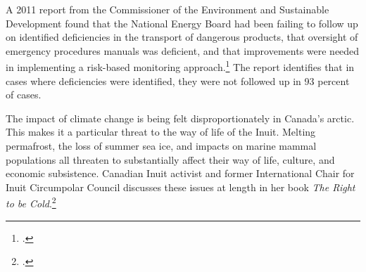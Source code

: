 A 2011 report from the Commissioner of the Environment and Sustainable Development found that the National Energy Board had been failing to follow up on identified deficiencies in the transport of dangerous products, that oversight of emergency procedures manuals was deficient, and that improvements were needed in implementing a risk-based monitoring approach.\footcite[][p. 21, 24, 26]{CESD2011Dec}
The report identifies that in cases where deficiencies were identified, they were not followed up in 93 percent of cases.



The impact of climate change is being felt disproportionately in Canada's arctic.
This makes it a particular threat to the way of life of the Inuit.
Melting permafrost, the loss of summer sea ice, and impacts on marine mammal populations all threaten to substantially affect their way of life, culture, and economic subsistence.
Canadian Inuit activist and former International Chair for Inuit Circumpolar Council discusses these issues at length in her book \emph{The Right to be Cold}.\footcite[][]{RightToBeCold}



